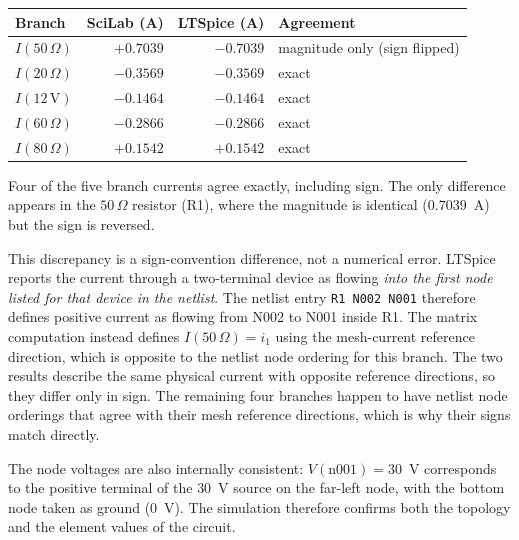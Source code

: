 \documentclass[11pt]{article}
\begin{document}
\begin{center}
\begin{tabular}{lrrl}
\hline
Branch & SciLab (A) & LTSpice (A) & Agreement \\
\hline
$I(50\,\Omega)$ & $+0.7039$ & $-0.7039$ & magnitude only (sign flipped) \\
$I(20\,\Omega)$ & $-0.3569$ & $-0.3569$ & exact \\
$I(12\,\text{V})$ & $-0.1464$ & $-0.1464$ & exact \\
$I(60\,\Omega)$ & $-0.2866$ & $-0.2866$ & exact \\
$I(80\,\Omega)$ & $+0.1542$ & $+0.1542$ & exact \\
\hline
\end{tabular}
\end{center}

Four of the five branch currents agree exactly, including sign. The only
difference appears in the $50\,\Omega$ resistor (R1), where the magnitude is
identical ($0.7039$~A) but the sign is reversed.

This discrepancy is a sign-convention difference, not a numerical error.
LTSpice reports the current through a two-terminal device as flowing
\emph{into the first node listed for that device in the netlist}. The netlist
entry \texttt{R1 N002 N001} therefore defines positive current as flowing from
N002 to N001 inside R1. The matrix computation instead defines $I(50\,\Omega)=i_1$
using the mesh-current reference direction, which is opposite to the netlist
node ordering for this branch. The two results describe the same physical
current with opposite reference directions, so they differ only in sign. The
remaining four branches happen to have netlist node orderings that agree with
their mesh reference directions, which is why their signs match directly.

The node voltages are also internally consistent: $V(\text{n001}) = 30$~V
corresponds to the positive terminal of the $30$~V source on the far-left node,
with the bottom node taken as ground ($0$~V). The simulation therefore confirms
both the topology and the element values of the circuit.

\end{document}

